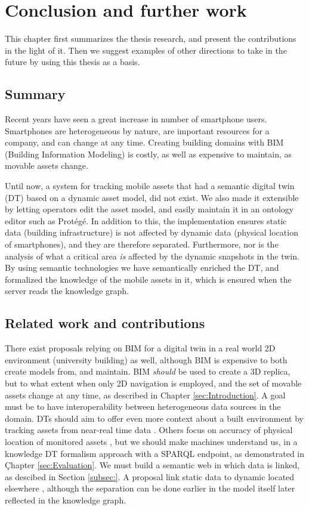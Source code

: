 \documentclass{article}
\begin{document}
\newpage
\section{Conclusion and further work}\label{sec:Conclusion}
This chapter first summarizes the thesis research, and present the contributions in the light of it. Then we suggest examples of other directions to take in the future by using this thesis as a basis.

\subsection{Summary}
Recent years have seen a great increase in number of smartphone users. Smartphones are heterogeneous by nature, are important resources for a company, and can change at any time. Creating building domains with BIM (Building Information Modeling) is costly, as well as expensive to maintain, as movable assets change.  

Until now, a system for tracking mobile assets that had a semantic digital twin (DT) based on a dynamic asset model, did not exist. We also made it extensible by letting operators edit the asset model, and easily maintain it in an ontology editor such as Protégé. In addition to this, the implementation ensures static data (building infrastructure) is not affected by dynamic data (physical location of smartphones), and they are therefore separated. Furthermore, nor is the analysis of what a critical area \emph{is} affected by the dynamic snapshots in the twin. By using semantic technologies we have semantically enriched the DT, and formalized the knowledge of the mobile assets in it, which is ensured when the server reads the knowledge graph.

\subsection{Related work and contributions}
There exist proposals relying on BIM for a digital twin in a real world 2D environment (university building) \cite{pauwels_live_2023} as well, although BIM is expensive to both create models from, and maintain. BIM \emph{should} be used to create a 3D replica, but to what extent when only 2D navigation is employed, and the set of movable assets change at any time, as described in Chapter \ref{sec:Introduction}. A goal must be to have interoperability between heterogeneous data sources in the domain. DTs should aim to offer even more context about a built environment by tracking assets from near-real time data \cite{godager_concept_2021}. Others focus on accuracy of physical location of monitored assets \cite{marcheta_development_2022, akram_design_2021}, but we should make machines understand us, in a knowledge DT formalism approach with a SPARQL endpoint, as demonstrated in Çhapter \ref{sec:Evaluation}. We must build a semantic web in which data is linked, as descibed in Section \ref{subsec:}. A proposal link static data to dynamic located elsewhere \cite{waszak_let_2022}, although the separation can be done earlier in the model itself later reflected in the knowledge graph.
\end{document}
